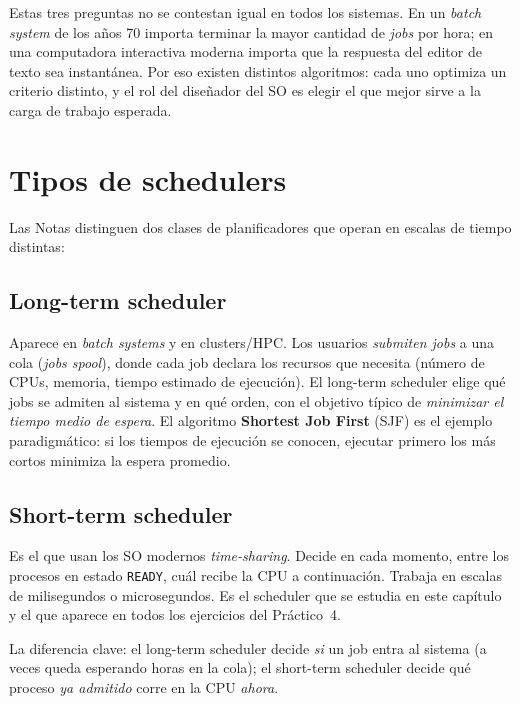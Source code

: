 \documentclass[11pt,a4paper]{article}
\begin{document}
Estas tres preguntas no se contestan igual en todos los sistemas. En
un \emph{batch system} de los años 70 importa terminar la mayor
cantidad de \emph{jobs} por hora; en una computadora interactiva
moderna importa que la respuesta del editor de texto sea instantánea.
Por eso existen distintos algoritmos: cada uno optimiza un criterio
distinto, y el rol del diseñador del SO es elegir el que mejor sirve a
la carga de trabajo esperada.

\section{Tipos de schedulers}

Las Notas distinguen dos clases de planificadores que operan en
escalas de tiempo distintas:

\subsection{Long-term scheduler}

Aparece en \emph{batch systems} y en clusters/HPC. Los usuarios
\emph{submiten jobs} a una cola (\emph{jobs spool}), donde cada job
declara los recursos que necesita (número de CPUs, memoria, tiempo
estimado de ejecución). El long-term scheduler elige qué jobs se
admiten al sistema y en qué orden, con el objetivo típico de
\emph{minimizar el tiempo medio de espera}. El algoritmo
\textbf{Shortest Job First} (SJF) es el ejemplo paradigmático: si los
tiempos de ejecución se conocen, ejecutar primero los más cortos
minimiza la espera promedio.

\subsection{Short-term scheduler}

Es el que usan los SO modernos \emph{time-sharing}. Decide en cada
momento, entre los procesos en estado \texttt{READY}, cuál recibe la
CPU a continuación. Trabaja en escalas de milisegundos o
microsegundos. Es el scheduler que se estudia en este capítulo y el
que aparece en todos los ejercicios del Práctico~4.

\begin{idea}
La diferencia clave: el long-term scheduler decide \emph{si} un job
entra al sistema (a veces queda esperando horas en la cola); el
short-term scheduler decide qué proceso \emph{ya admitido} corre en
la CPU \emph{ahora}.
\end{idea}
\end{document}
